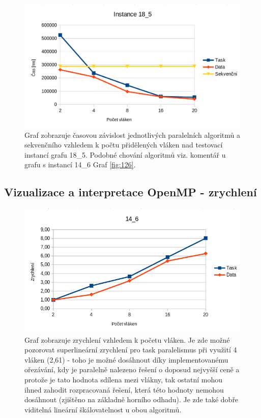 \documentclass{article}%
\begin{document}
\begin{figure}[H]%
    \centering%
    \includegraphics[width=1\linewidth]{images/18_5_2.png}%
    \caption{Graf zobrazuje časovou závislost jednotlivých paralelních algoritmů a sekvenčního vzhledem k počtu přidělených vláken nad testovací instancí grafu 18\_5. Podobné chování algoritmů viz. komentář u grafu s instancí 14\_6  Graf \ref{fig:126}.  }%
    \label{fig:185}
\end{figure}

\subsection{Vizualizace a interpretace OpenMP - zrychlení}

\begin{figure}[H]%
    \centering%
    \includegraphics[width=1\linewidth]{images/acc_14_6.png}%

    \caption{Graf zobrazuje zrychlení vzhledem k početu vláken. Je zde možné pozorovat superlineární zrychlení pro task paralelismus při využití 4 vláken (2,61) - toho je možné dosáhnout díky implementovanému ořezávání, kdy je paralelně nalezeno řešení o doposud nejvyšší ceně a protože je tato hodnota sdílena mezi vlákny, tak ostatní mohou ihned zahodit rozpracovaná řešení, která této hodnoty nemohou dosáhnout (zjištěno na základně horního odhadu). Je zde také dobře viditelná lineární škálovatelnost u obou algoritmů. }%
    \label{fig:acc126}
\end{figure}
\end{document}
